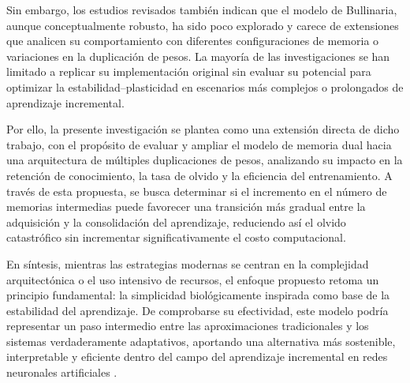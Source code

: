 \documentclass[10pt,a4paper]{article}
\begin{document}
Sin embargo, los estudios revisados también indican que el modelo de Bullinaria, aunque conceptualmente robusto, ha sido poco explorado y carece de extensiones que analicen su comportamiento con diferentes configuraciones de memoria o variaciones en la duplicación de pesos. 
La mayoría de las investigaciones se han limitado a replicar su implementación original sin evaluar su potencial para optimizar la estabilidad–plasticidad en escenarios más complejos o prolongados de aprendizaje incremental.

Por ello, la presente investigación se plantea como una extensión directa de dicho trabajo, con el propósito de evaluar y ampliar el modelo de memoria dual hacia una arquitectura de múltiples duplicaciones de pesos, analizando su impacto en la retención de conocimiento, la tasa de olvido y la eficiencia del entrenamiento. 
A través de esta propuesta, se busca determinar si el incremento en el número de memorias intermedias puede favorecer una transición más gradual entre la adquisición y la consolidación del aprendizaje, reduciendo así el olvido catastrófico sin incrementar significativamente el costo computacional.

En síntesis, mientras las estrategias modernas se centran en la complejidad arquitectónica o el uso intensivo de recursos, el enfoque propuesto retoma un principio fundamental: la simplicidad biológicamente inspirada como base de la estabilidad del aprendizaje. 
De comprobarse su efectividad, este modelo podría representar un paso intermedio entre las aproximaciones tradicionales y los sistemas verdaderamente adaptativos, aportando una alternativa más sostenible, interpretable y eficiente dentro del campo del aprendizaje incremental en redes neuronales artificiales .




\printindex
\end{document}
